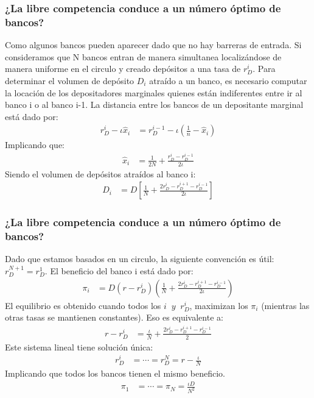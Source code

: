 \documentclass[10pt, xcolor=table, x11names]{beamer}
\begin{document}
\begin{frame}
    \frametitle{{\normalsize ¿La libre competencia conduce a un número óptimo de bancos?} {}}
    Como algunos bancos pueden aparecer dado que no hay barreras de entrada. Si consideramos que N bancos entran de manera simultanea localizándose de manera uniforme en el circulo y creado depósitos a una tasa de $r_{D}^{i}$. Para determinar el volumen de depósito $D_{i}$ atraído a un banco, es necesario computar la locación de los depositadores marginales quienes están indiferentes entre ir al banco i o al banco i-1. La distancia entre los bancos de un depositante marginal está dado por:
     \begin{align}
   r_{D}^{i}-\iota\hat{x}_{i}&=r_{D}^{i-1}-\iota \left( \frac{1}{n}-\hat{x}_{i}\right) 
    \end{align}  
    Implicando que:
    \begin{align}
   \hat{x}_{i}&=\frac{1}{2N}+\frac{r_{D}^{i}-r_{D}^{i-1}}{2\iota}\nonumber
    \end{align}  
    Siendo el volumen de depósitos atraídos al banco i:
    \begin{align}
    D_{i}&=D\left[\frac{1}{N}+\frac{2r_{D}^{i}-r_{D}^{i+1}-r_{D}^{i-1}}{2\iota} \right] \nonumber
    \end{align}  
    
\end{frame}

\begin{frame}
    \frametitle{{\normalsize ¿La libre competencia conduce a un número óptimo de bancos?} {}}
    Dado que estamos basados en un circulo, la siguiente convención es útil: 
    $r_{D}^{N+1}=r_{D}^{1}$. El beneficio del banco i está dado por:
    \begin{align}
    \pi_{i}&=D(r-r_{D}^{i})\left(\frac{1}{N}+\frac{2r_{D}^{i}-r_{D}^{i+1}-r_{D}^{i-1}}{2\iota} \right) \nonumber
    \end{align}  
    El equilibrio es obtenido cuando todos los $i\; \; y\; \; r_{D}^{i}$, maximizan los $\pi_{i}$ (mientras las otras tasas se mantienen constantes). Eso es equivalente a:
     \begin{align}
     r-r_{D}^{i}&=\frac{\iota}{N}+\frac{2r_{D}^{i}-r_{D}^{i+1}-r_{D}^{i-1}}{2}  \nonumber
     \end{align}  
    Este sistema lineal tiene solución única: 
    \begin{align}
    r_{D}^{i}&=\cdots=r_{D}^{N}=r-\frac{\iota}{N} \nonumber
    \end{align} 
    Implicando que todos los bancos tienen el mismo beneficio.
    \begin{align}
    \pi_{1}&=\cdots=\pi_{N}=\frac{\iota D}{N^{2}} \nonumber
    \end{align} 
\end{frame}
\end{document}
